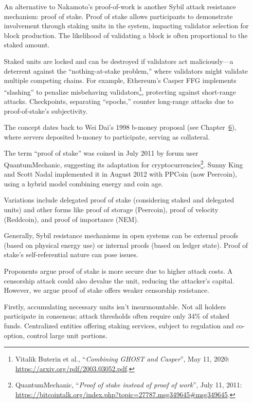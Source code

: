 \documentclass[
  a5paper,
  smalldemyvopaper,10pt,twoside,onecolumn,openright,extrafontsizes,hidelinks]{memoir}
\begin{document}

An alternative to Nakamoto's proof-of-work is another Sybil attack
resistance mechanism: proof of stake. Proof of stake allows participants
to demonstrate involvement through staking units in the system,
impacting validator selection for block production. The likelihood of
validating a block is often proportional to the staked amount.

Staked units are locked and can be destroyed if validators act
maliciously---a deterrent against the ``nothing-at-stake problem,''
where validators might validate multiple competing chains. For example,
Ethereum's Casper FFG implements ``slashing'' to penalize misbehaving
validators\footnote{Vitalik Buterin et al., ``\emph{Combining GHOST and
  Casper}'', May 11, 2020: \url{https://arxiv.org/pdf/2003.03052.pdf}.},
protecting against short-range attacks. Checkpoints, separating
``epochs,'' counter long-range attacks due to proof-of-stake's
subjectivity.

The concept dates back to Wei Dai's 1998 b-money proposal (see
Chapter~\hyperref[ch:cybermonnaie]{6}), where servers deposited b-money
to participate, serving as collateral.

The term ``proof of stake'' was coined in July 2011 by forum user
QuantumMechanic, suggesting its adaptation for
cryptocurrencies\footnote{QuantumMechanic, ``\emph{Proof of stake
  instead of proof of work}'', July 11, 2011:
  \url{https://bitcointalk.org/index.php?topic=27787.msg349645\#msg349645}.}.
Sunny King and Scott Nadal implemented it in August 2012 with PPCoin
(now Peercoin), using a hybrid model combining energy and coin age.

Variations include delegated proof of stake (considering staked and
delegated units) and other forms like proof of storage (Peercoin), proof
of velocity (Reddcoin), and proof of importance (NEM).

Generally, Sybil resistance mechanisms in open systems can be external
proofs (based on physical energy use) or internal proofs (based on
ledger state). Proof of stake's self-referential nature can pose issues.

Proponents argue proof of stake is more secure due to higher attack
costs. A censorship attack could also devalue the unit, reducing the
attacker's capital. However, we argue proof of stake offers weaker
censorship resistance.

Firstly, accumulating necessary units isn't insurmountable. Not all
holders participate in consensus; attack thresholds often require only
34\% of staked funds. Centralized entities offering staking services,
subject to regulation and co-option, control large unit portions.
\end{document}
